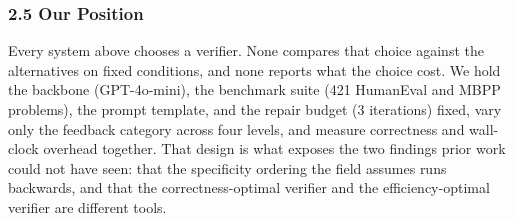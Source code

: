\subsubsection{2.5 Our Position}

Every system above chooses a verifier. None compares that choice against the alternatives on fixed conditions, and none reports what the choice cost. We hold the backbone (GPT-4o-mini), the benchmark suite (421 HumanEval and MBPP problems), the prompt template, and the repair budget (3 iterations) fixed, vary only the feedback category across four levels, and measure correctness and wall-clock overhead together. That design is what exposes the two findings prior work could not have seen: that the specificity ordering the field assumes runs backwards, and that the correctness-optimal verifier and the efficiency-optimal verifier are different tools.


